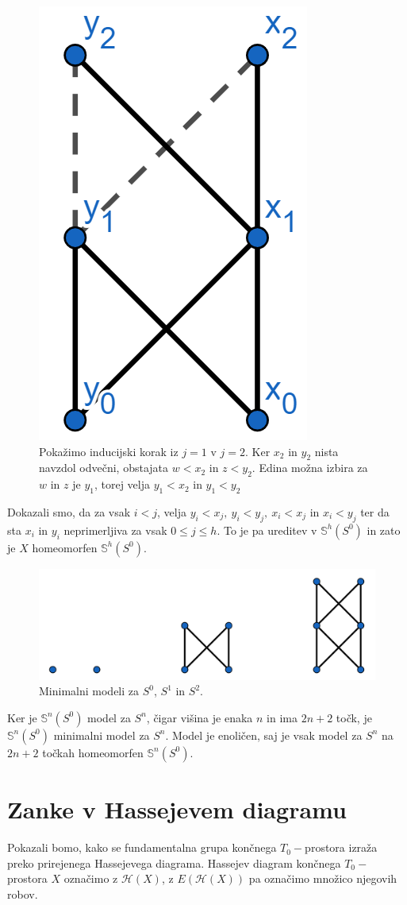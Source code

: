 \documentclass[mat1]{fmfdelo}
\DeclareRobustCommand{\h}{
    \mathcal{H}}
\newcommand{\Sus}{\mathbb S}
\begin{document}
\begin{dokaz}
          
          \begin{figure}[h!]
            \centering
            \includegraphics[width=0.2\linewidth]{minsfera-zadnja.png}
          \caption{Pokažimo inducijski korak iz $j=1$ v $j=2$. Ker $x_2$ in $y_2$ nista navzdol odvečni, obstajata $w<x_2$ in $z<y_2$. Edina možna izbira za $w$ in $z$ je $y_1$, torej velja $y_1<x_2$ in $y_1<y_2$}
          \end{figure}
  
          Dokazali smo, da za vsak $i<j$,  velja $y_i < x_j,\ y_i < y_j,\ x_i < x_j$ in
$x_i < y_j$ ter da sta $x_i$ in $y_i$ neprimerljiva za vsak $0\leq j \leq h$.
To je pa ureditev v $\Sus^h(S^0)$ in zato je $X$ homeomorfen 
    $\Sus^h(S^0)$.
  
\end{dokaz}

\begin{figure}[h]
    \centering
    \includegraphics[width=0.8\linewidth]{sfere.png}
    \caption{Minimalni modeli za $S^0$, $S^1$ in $S^2$.}
\end{figure}

Ker je $\Sus^n(S^0)$ model za $S^n$, čigar višina je enaka $n$ in ima 
$2n+2$ točk, je $\Sus^n(S^0)$ minimalni model za $S^n$. Model je 
enoličen, saj je vsak model za $S^n$ na $2n+2$ točkah homeomorfen 
$\Sus^n(S^0)$.
\section{Zanke v Hassejevem diagramu}\label{sec:hasse}

Pokazali bomo, kako se fundamentalna grupa končnega $T_0-$prostora izraža preko prirejenega Hassejevega diagrama.
Hassejev diagram končnega $T_0-$prostora $X$ označimo z 
$\h(X)$, z $E(\h(X))$ pa označimo množico njegovih robov.
\end{document}
